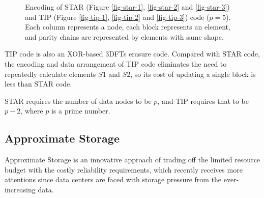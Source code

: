 \documentclass[sigconf]{acmart}
\begin{document}
\begin{figure}[!ht]
\hspace{5pt}
\caption{Encoding of STAR (Figure \ref{fig-star-1}, \ref{fig-star-2} and \ref{fig-star-3}) and TIP (Figure \ref{fig-tip-1}, \ref{fig-tip-2} and \ref{fig-tip-3}) code ($p = 5$). Each column represents a node, each block represents an element, and parity chains are represented by elements with same shape.}
\label{fig-star-tip}
\end{figure}

TIP code is also an XOR-based 3DFTs erasure code.
Compared with STAR code, the encoding and data arrangement of TIP code eliminates the need to repeatedly calculate elements $S1$ and $S2$, so its cost of updating a single block is less than STAR code.

STAR requires the number of data nodes to be $p$, and TIP requires that to be $p-2$, where $p$ is a prime number.


\subsection{Approximate Storage}
Approximate Storage is an innovative approach of trading off the limited resource budget with the costly reliability requirements, which recently receives more attentions since data centers are faced with storage pressure from the ever-increasing data.
\end{document}
